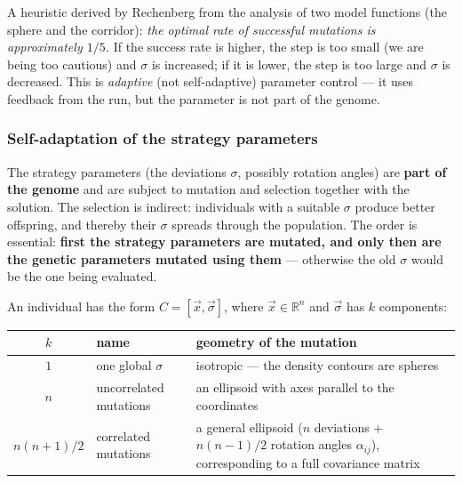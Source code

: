 \documentclass[11pt,a4paper]{article}
\theoremstyle{definition}
\begin{document}
\begin{defbox}
A heuristic derived by Rechenberg from the analysis of two model functions (the
sphere and the corridor): \emph{the optimal rate of successful mutations is
approximately $1/5$.} If the success rate is higher, the step is too small (we
are being too cautious) and $\sigma$ is increased; if it is lower, the step is
too large and $\sigma$ is decreased. This is \emph{adaptive} (not
self-adaptive) parameter control --- it uses feedback from the run, but the
parameter is not part of the genome.
\end{defbox}

\subsubsection{Self-adaptation of the strategy parameters}

\begin{defbox}
The strategy parameters (the deviations $\sigma$, possibly rotation angles) are
\textbf{part of the genome} and are subject to mutation and selection together
with the solution. The selection is indirect: individuals with a suitable
$\sigma$ produce better offspring, and thereby their $\sigma$ spreads through
the population. The order is essential: \textbf{first the strategy parameters
are mutated, and only then are the genetic parameters mutated using them} ---
otherwise the old $\sigma$ would be the one being evaluated.
\end{defbox}

An individual has the form $C = [\vec x, \vec \sigma]$, where
$\vec x \in \mathbb{R}^n$ and $\vec\sigma$ has $k$ components:

\begin{center}
\begin{tabular}{@{}clp{8.2cm}@{}}
\toprule
$k$ & name & geometry of the mutation \\
\midrule
$1$ & one global $\sigma$ & isotropic --- the density contours are spheres \\
$n$ & uncorrelated mutations & an ellipsoid with axes parallel to the
  coordinates \\
$n(n+1)/2$ & correlated mutations & a general ellipsoid ($n$ deviations $+$
  $n(n-1)/2$ rotation angles $\alpha_{ij}$), corresponding to a full covariance
  matrix \\
\bottomrule
\end{tabular}
\end{center}
\end{document}
